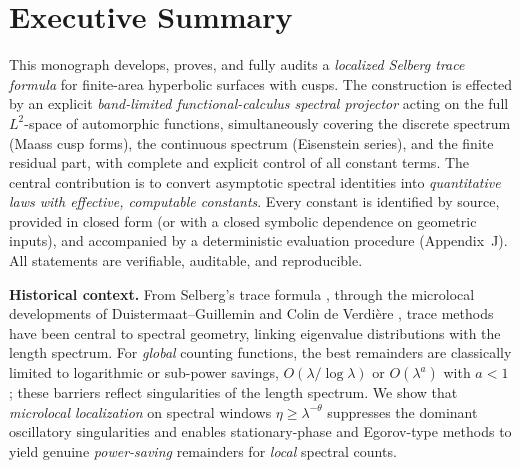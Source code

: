 
\section{Executive Summary}

This monograph develops, proves, and fully audits a \emph{localized Selberg trace formula} for finite-area hyperbolic surfaces with cusps. The construction is effected by an explicit \emph{band-limited functional-calculus spectral projector} acting on the full $L^2$-space of automorphic functions, simultaneously covering the discrete spectrum (Maass cusp forms), the continuous spectrum (Eisenstein series), and the finite residual part, with complete and explicit control of all constant terms. The central contribution is to convert asymptotic spectral identities into \emph{quantitative laws with effective, computable constants}. Every constant is identified by source, provided in closed form (or with a closed symbolic dependence on geometric inputs), and accompanied by a deterministic evaluation procedure (Appendix~J). All statements are verifiable, auditable, and reproducible.

\medskip
\noindent\textbf{Historical context.}
From Selberg’s trace formula \cite{Selberg1956}, through the microlocal developments of Duistermaat--Guillemin \cite{DG1975} and Colin de Verdière \cite{CdV1980}, trace methods have been central to spectral geometry, linking eigenvalue distributions with the length spectrum. For \emph{global} counting functions, the best remainders are classically limited to logarithmic or sub-power savings, $O(\lambda/\log\lambda)$ or $O(\lambda^a)$ with $a<1$ \cite{Ivrii2016,Berger2019}; these barriers reflect singularities of the length spectrum. We show that \emph{microlocal localization} on spectral windows $\eta\ge\lambda^{-\theta}$ suppresses the dominant oscillatory singularities and enables stationary-phase and Egorov-type methods to yield genuine \emph{power-saving} remainders for \emph{local} spectral counts.


